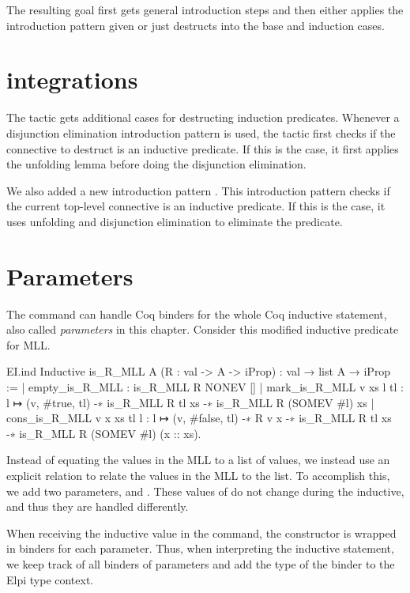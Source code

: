 \documentclass[thesis.tex]{subfiles}
\begin{document}
{The resulting goal first gets general introduction steps and then either applies the introduction pattern given or just destructs into the base and induction cases.

\section{ integrations}\label{sec:indintros}
The  tactic gets additional cases for destructing induction predicates. Whenever a disjunction elimination introduction pattern is used, the tactic first checks if the connective to destruct is an inductive predicate. If this is the case, it first applies the unfolding lemma before doing the disjunction elimination.

We also added a new introduction pattern . This introduction pattern checks if the current top-level connective is an inductive predicate. If this is the case, it uses unfolding and disjunction elimination to eliminate the predicate.

\section{Parameters}\label{sec:parameters}
The  command can handle Coq binders for the whole Coq inductive statement, also called \emph{parameters} in this chapter. Consider this modified inductive predicate for MLL.
\begin{coqcode}
  EI.ind
  Inductive is_R_MLL {A} (R : val -> A -> iProp) :
                     val → list A → iProp :=
    | empty_is_R_MLL : is_R_MLL R NONEV []
    | mark_is_R_MLL v xs l tl : 
        l ↦ (v, #true, tl) -∗ is_R_MLL R tl xs -∗ 
        is_R_MLL R (SOMEV #l) xs
    | cons_is_R_MLL v x xs tl l : 
        l ↦ (v, #false, tl) -∗ R v x -∗ 
        is_R_MLL R tl xs -∗ 
        is_R_MLL R (SOMEV #l) (x :: xs).
\end{coqcode}
Instead of equating the values in the MLL to a list of values, we instead use an explicit relation to relate the values in the MLL to the list. To accomplish this, we add two parameters,  and . These values of  do not change during the inductive, and thus they are handled differently.

When receiving the inductive value in the command, the  constructor is wrapped in binders for each parameter. Thus, when interpreting the inductive statement, we keep track of all binders of parameters and add the type of the binder to the Elpi type context.

}
\end{document}
